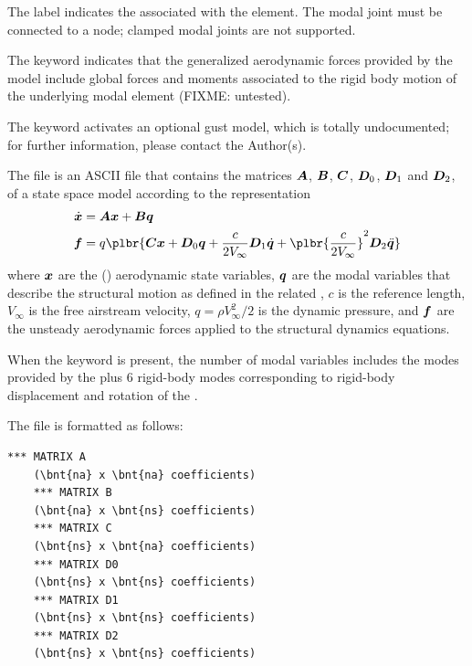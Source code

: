 The label  indicates
the 
associated with the  element.
The modal joint must be connected to a  node;
clamped modal joints are not supported.

The keyword  indicates that the generalized aerodynamic forces
provided by the model include global forces and moments associated
to the rigid body motion of the underlying modal element (FIXME: untested).

The keyword  activates an optional gust model,
which is totally undocumented;
for further information, please contact the Author(s).

The  file is an ASCII file that contains
the matrices $\boldsymbol{A}$, $\boldsymbol{B}$, $\boldsymbol{C}$, $\boldsymbol{D}_0$, $\boldsymbol{D}_1$ and $\boldsymbol{D}_2$,
of a state space model according to the representation
\begin{align*}
	\dot{\T{x}}
	&=
	\T{A}\T{x} + \T{B}\T{q}
	\\
	\T{f}
	&=
	q\plbr{\T{C}\T{x} + \T{D}_0 \T{q} + \frac{c}{2V_{\infty}} \T{D}_1 \dot{\T{q}} + \plbr{\frac{c}{2V_{\infty}}}^2 \T{D}_2 \ddot{\T{q}}}
\end{align*}
where $\boldsymbol{x}$ are the  ()
aerodynamic state variables,
$\boldsymbol{q}$ are the  modal variables that describe the structural motion
as defined in the related ,
$c$ is the reference length, $V_\infty$ is the free airstream velocity,
$q = \rho V_{\infty}^2/2$ is the dynamic pressure,
and $\boldsymbol{f}$ are the unsteady aerodynamic forces applied to the structural
dynamics equations.

When the keyword  is present, the number of modal variables 
includes the modes provided
by the 
plus 6 rigid-body modes corresponding to rigid-body displacement
and rotation of the .

The file is formatted as follows:
\begin{Verbatim}[commandchars=\\\{\}]
    *** MATRIX A
    (\bnt{na} x \bnt{na} coefficients)
    *** MATRIX B
    (\bnt{na} x \bnt{ns} coefficients)
    *** MATRIX C
    (\bnt{ns} x \bnt{na} coefficients)
    *** MATRIX D0
    (\bnt{ns} x \bnt{ns} coefficients)
    *** MATRIX D1
    (\bnt{ns} x \bnt{ns} coefficients)
    *** MATRIX D2
    (\bnt{ns} x \bnt{ns} coefficients)
\end{Verbatim}

